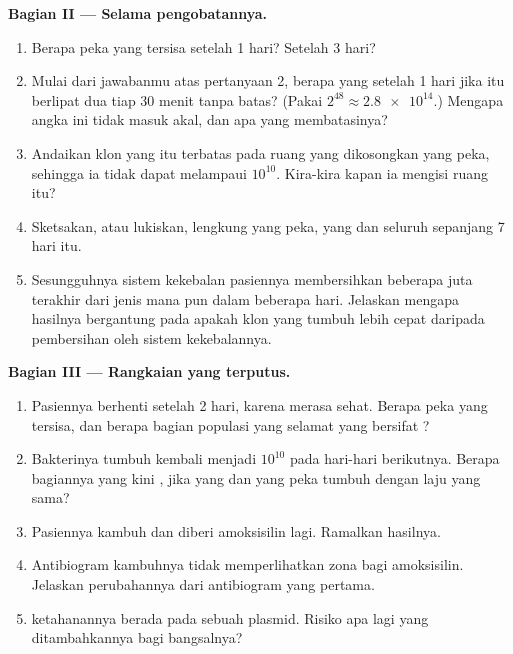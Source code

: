 \begin{problem}
\medskip
\noindent\textbf{Bagian II --- Selama pengobatannya.}
\begin{enumerate}[resume]
  \item Berapa  peka yang tersisa setelah 1 hari? Setelah 3 hari?
  \item Mulai dari jawabanmu atas pertanyaan 2, berapa  yang 
        setelah 1 hari jika  itu berlipat dua tiap 30 menit tanpa
        batas? (Pakai $2^{48} \approx \num{2.8e14}$.) Mengapa angka ini
        tidak masuk akal, dan apa yang membatasinya?
  \item Andaikan klon yang  itu terbatas pada ruang yang
        dikosongkan  yang peka, sehingga ia tidak dapat melampaui
        $10^{10}$. Kira-kira kapan ia mengisi ruang itu?
  \item Sketsakan, atau lukiskan, lengkung  yang peka,  yang
         dan seluruh  sepanjang 7 hari itu.
  \item Sesungguhnya sistem kekebalan pasiennya membersihkan beberapa
        juta  terakhir dari jenis mana pun dalam beberapa hari.
        Jelaskan mengapa hasilnya bergantung pada apakah klon yang
         tumbuh lebih cepat daripada pembersihan oleh sistem
        kekebalannya.
\end{enumerate}

\medskip
\noindent\textbf{Bagian III --- Rangkaian yang terputus.}
\begin{enumerate}[resume]
  \item Pasiennya berhenti setelah 2 hari, karena merasa sehat. Berapa
         peka yang tersisa, dan berapa bagian populasi yang selamat
        yang bersifat ?
  \item Bakterinya tumbuh kembali menjadi $10^{10}$ pada hari-hari
        berikutnya. Berapa bagiannya yang kini , jika  yang
         dan  yang peka tumbuh dengan laju yang sama?
  \item Pasiennya kambuh dan diberi amoksisilin lagi. Ramalkan hasilnya.
  \item Antibiogram kambuhnya tidak memperlihatkan zona bagi
        amoksisilin. Jelaskan perubahannya dari antibiogram yang pertama.
  \item {} ketahanannya berada pada sebuah plasmid. Risiko apa lagi
        yang ditambahkannya bagi bangsalnya?
\end{enumerate}


\end{problem}
